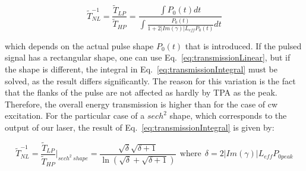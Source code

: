 \documentclass[10pt,letterpaper]{article}
\begin{document}

\begin{equation}
\tilde{T}_{NL}^{-1} = \frac{\tilde{T}_{LP}}{\tilde{T}_{HP}} = \frac{\int P_0(t)dt}{\int \frac{P_0(t)}{1+2|Im(\gamma)| L_{eff} P_0(t)} dt}
\label{eq:transmissionIntegral}
\end{equation}


which depends on the actual pulse shape $P_{0}(t)$ that is introduced. If the pulsed signal has a rectangular shape, one can use Eq.~\ref{eq:transmissionLinear}, but if the shape is different, the integral in Eq.~\ref{eq:transmissionIntegral} must be solved, as the result differs significantly. The reason for this variation is the fact that the flanks of the pulse are not affected as hardly by TPA as the peak. Therefore, the overall energy transmission is higher than for the case of cw excitation. For the particular case of a $sech^2$ shape, which corresponds to the output of our laser, the result of  Eq.~\ref{eq:transmissionIntegral} is given by:






\begin{equation}
\tilde{T}_{NL}^{-1} = \frac{\tilde{T}_{LP}}{\tilde{T}_{HP}} \bigg|_{sech^2~shape}  = \frac{\sqrt{\delta}\sqrt{\delta + 1}}{\ln(\sqrt{\delta}+\sqrt{\delta+1})} ~~\mathrm{where}~~  \delta = 2|Im(\gamma)| L_{eff} P_{0 peak}
\label{eq:transmissionHypSecant}
\end{equation}

\end{document}
